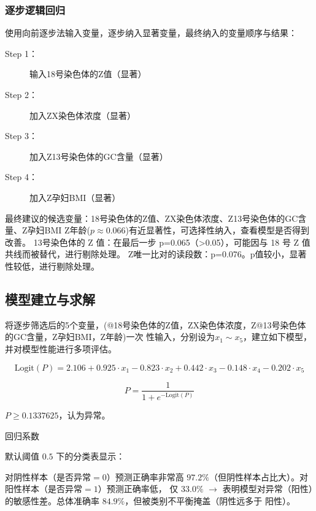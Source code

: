 \documentclass[withoutpreface,notoc]{cumcmthesis}
\begin{document}
	\subsubsection{逐步逻辑回归}
	使用向前逐步法输入变量，逐步纳入显著变量，最终纳入的变量顺序与结果：
	\begin{description}
		\item[Step 1：] 输入18号染色体的Z值（显著）
		\item[Step 2：] 加入ZX染色体浓度（显著）
		\item[Step 3：] 加入Z13号染色体的GC含量（显著）
		\item[Step 4：] 加入Z孕妇BMI（显著） 
	\end{description}


	最终建议的候选变量：18号染色体的Z值、ZX染色体浓度、Z13号染色体的GC含量、Z孕妇BMI
	Z年龄($ p \approx 0.066 $)有近显著性，可选择性纳入，查看模型是否得到改善。
	13号染色体的 Z 值：在最后一步 p=0.065（>0.05），可能因与 18 号 Z 值共线而被替代，进行剔除处理。
	Z唯一比对的读段数：p=0.076。p值较小，显著性较低，进行剔除处理。

	\subsection{模型建立与求解}

	将逐步筛选后的5个变量，(@18号染色体的Z值，ZX染色体浓度，Z@13号染色体的GC含量，Z孕妇BMI，Z年龄)一次
	性输入，分别设为$\displaystyle x_{1}\sim x_{5}$，建立如下模型，并对模型性能进行多项评估。

	\begin{equation*}
	\label{logit}
	\text{Logit}(P) = 2.106 + 0.925 \cdot x_{1} - 0.823 \cdot x_{2} + 0.442 \cdot x_{3} - 0.148 \cdot x_{4} - 0.202 \cdot x_{5}
	\end{equation*}

	\begin{equation*}
	P = \frac{1}{1 + e^{-\mathrm{Logit}(P)}}
	\end{equation*}

	$P\geq0.1337625 $，认为异常。


	回归系数


	默认阈值 $0.5$ 下的分类表显示：

	对阴性样本（是否异常$=0$）预测正确率非常高 $97.2\%$（但阴性样本占比大）。对阳性样本（是否异常$=1$）预测正确率低，
	仅 $33.0\%$ $\rightarrow$ 表明模型对异常（阳性）的敏感性差。总体准确率 $84.9\%$，但被类别不平衡掩盖（阴性远多于
	阳性）。

	
\end{document}
